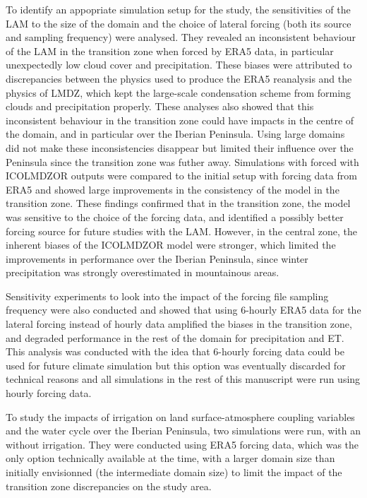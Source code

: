 To identify an appopriate simulation setup for the study, the sensitivities of the LAM to the size of the domain and the choice of lateral forcing (both its source and sampling frequency) were analysed. They revealed an inconsistent behaviour of the LAM in the transition zone when forced by ERA5 data, in particular unexpectedly low cloud cover and precipitation. These biases were attributed to discrepancies between the physics used to produce the ERA5 reanalysis and the physics of LMDZ, which kept the large-scale condensation scheme from forming clouds and precipitation properly.
These analyses also showed that this inconsistent behaviour in the transition zone could have impacts in the centre of the domain, and in particular over the Iberian Peninsula. Using large domains did not make these inconsistencies disappear but limited their influence over the Peninsula since the transition zone was futher away.
Simulations with forced with ICOLMDZOR outputs were compared to the initial setup with forcing data from ERA5 and showed large improvements in the consistency of the model in the transition zone. These findings confirmed that in the transition zone, the model was sensitive to the choice of the forcing data, and identified a possibly better forcing source for future studies with the LAM. However, in the central zone, the inherent biases of the ICOLMDZOR model were stronger, which limited the improvements in performance over the Iberian Peninsula, since winter precipitation was strongly overestimated in mountainous areas.

Sensitivity experiments to look into the impact of the forcing file sampling frequency were also conducted and showed that using 6-hourly ERA5 data for the lateral forcing instead of hourly data amplified the biases in the transition zone, and degraded performance in the rest of the domain for precipitation and ET. This analysis was conducted with the idea that 6-hourly forcing data could be used for future climate simulation but this option was eventually discarded for technical reasons and all simulations in the rest of this manuscript were run using hourly forcing data.


\hfill

To study the impacts of irrigation on land surface-atmosphere coupling variables and the water cycle over the Iberian Peninsula, two simulations were run, with an without irrigation. They were conducted using ERA5 forcing data, which was the only option technically available at the time, with a larger domain size than initially envisionned (the intermediate domain size) to limit the impact of the transition zone discrepancies on the study area.

